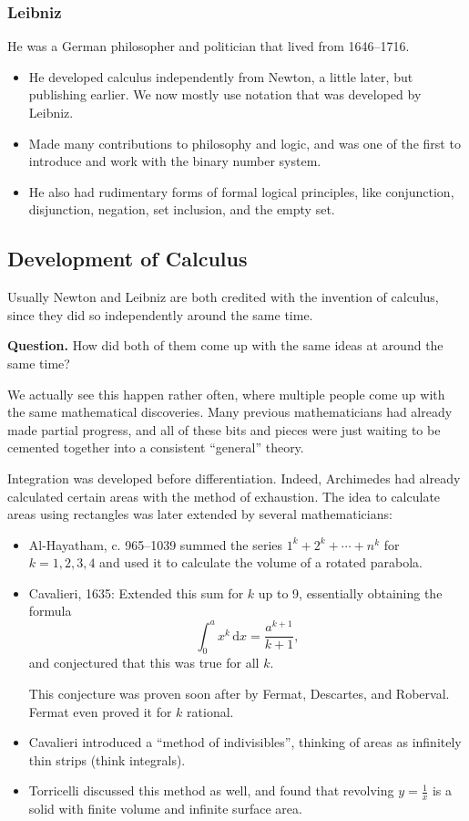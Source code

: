 \documentclass[class=article, crop=false]{standalone}
\begin{document}
  \subsubsection{Leibniz}
  He was a German philosopher and politician that lived from 1646--1716.
  \begin{itemize}
    \item He developed calculus independently from Newton, a little later, but publishing earlier. We now mostly use notation that was developed by Leibniz.
    \item Made many contributions to philosophy and logic, and was one of the first to introduce and work with the binary number system.
    \item He also had rudimentary forms of formal logical principles, like conjunction, disjunction, negation, set inclusion, and the empty set.
  \end{itemize}
  \subsection{Development of Calculus}
  Usually Newton and Leibniz are both credited with the invention of calculus, since they did so independently around the same time. \par
  \textbf{Question.} How did both of them come up with the same ideas at around the same time? \par
  We actually see this happen rather often, where multiple people come up with the same mathematical discoveries. Many previous mathematicians had already made partial progress, and all of these bits and pieces were just waiting to be cemented together into a consistent ``general'' theory. \par
  Integration was developed before differentiation. Indeed, Archimedes had already calculated certain areas with the method of exhaustion. The idea to calculate areas using rectangles was later extended by several mathematicians:
  \begin{itemize}
    \item Al-Hayatham, c. 965--1039 summed the series $1^k + 2^k + \dotsb + n^k$ for $k = 1, 2, 3, 4$ and used it to calculate the volume of a rotated parabola.
    \item Cavalieri, 1635: Extended this sum for $k$ up to 9, essentially obtaining the formula
    \[
      \int_{0}^{a}x^k \,\mathrm dx = \frac{a^{k + 1}}{k + 1},
    \]
    and conjectured that this was true for all $k$.
    \begin{note}{}
      This conjecture was proven soon after by Fermat, Descartes, and Roberval. Fermat even proved it for $k$ rational.
    \end{note}
    \item Cavalieri introduced a ``method of indivisibles'', thinking of areas as infinitely thin strips (think integrals).
    \item Torricelli discussed this method as well, and found that revolving $y = \frac{1}{x}$ is a solid with finite volume and infinite surface area.
  \end{itemize}
\end{document}
